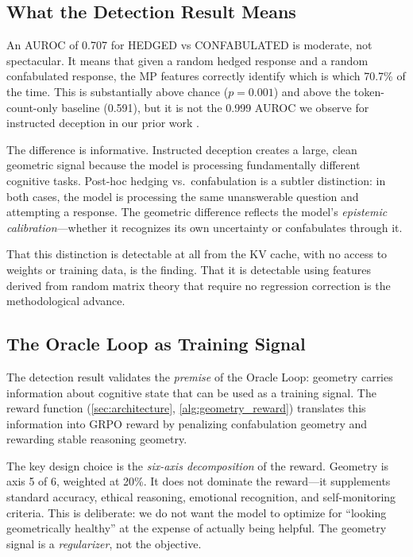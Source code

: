 \subsection{What the Detection Result Means}

An AUROC of 0.707 for HEDGED vs CONFABULATED is moderate, not spectacular.
It means that given a random hedged response and a random confabulated
response, the MP features correctly identify which is which 70.7\% of the
time. This is substantially above chance ($p = 0.001$) and above the
token-count-only baseline (0.591), but it is not the 0.999 AUROC we
observe for instructed deception in our prior work \citep{lyra2026detecting}.

The difference is informative. Instructed deception creates a large,
clean geometric signal because the model is processing fundamentally
different cognitive tasks. Post-hoc hedging vs.\ confabulation is a
subtler distinction: in both cases, the model is processing the same
unanswerable question and attempting a response. The geometric difference
reflects the model's \emph{epistemic calibration}---whether it recognizes
its own uncertainty or confabulates through it.

That this distinction is detectable at all from the KV cache, with no
access to weights or training data, is the finding. That it is detectable
using features derived from random matrix theory that require no
regression correction is the methodological advance.

\subsection{The Oracle Loop as Training Signal}

The detection result validates the \emph{premise} of the Oracle Loop:
geometry carries information about cognitive state that can be used as
a training signal. The reward function (\cref{sec:architecture},
\cref{alg:geometry_reward}) translates this information into GRPO
reward by penalizing confabulation geometry and rewarding stable
reasoning geometry.

The key design choice is the \emph{six-axis decomposition} of the reward.
Geometry is axis 5 of 6, weighted at 20\%. It does not dominate the
reward---it supplements standard accuracy, ethical reasoning, emotional
recognition, and self-monitoring criteria. This is deliberate: we do not
want the model to optimize for ``looking geometrically healthy'' at the
expense of actually being helpful. The geometry signal is a
\emph{regularizer}, not the objective.

